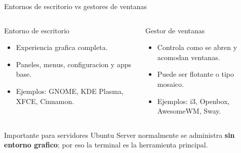 \documentclass[aspectratio=169]{beamer}
\begin{document}
\begin{frame}{Entornos de escritorio vs gestores de ventanas}
  \footnotesize
  \begin{columns}[t]
    \begin{block}{Entorno de escritorio}
      \begin{itemize}
        \item Experiencia grafica completa.
        \item Paneles, menus, configuracion y apps base.
        \item Ejemplos: GNOME, KDE Plasma, XFCE, Cinnamon.
      \end{itemize}
    \end{block}
    \begin{exampleblock}{Gestor de ventanas}
      \begin{itemize}
        \item Controla como se abren y acomodan ventanas.
        \item Puede ser flotante o tipo mosaico.
        \item Ejemplos: i3, Openbox, AwesomeWM, Sway.
      \end{itemize}
    \end{exampleblock}
  \end{columns}
  \vspace{0.12cm}
  \begin{alertblock}{Importante para servidores}
    Ubuntu Server normalmente se administra \textbf{sin entorno grafico}; por eso la terminal es la herramienta principal.
  \end{alertblock}
\end{frame}
\end{document}

